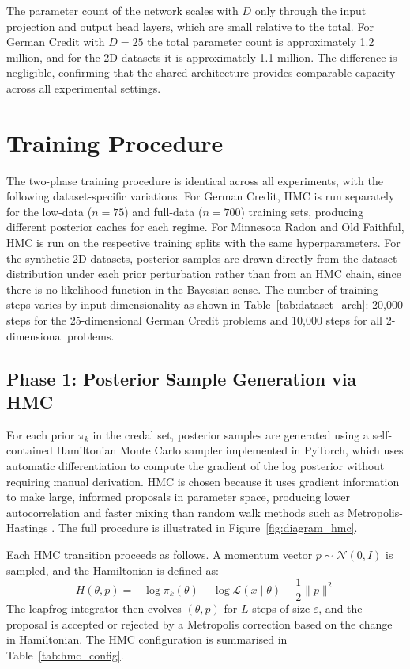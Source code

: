 The parameter count of the network scales 
with $D$ only through the input projection 
and output head layers, which are small 
relative to the total. For German Credit 
with $D = 25$ the total parameter count 
is approximately 1.2 million, and for 
the 2D datasets it is approximately 1.1 
million. The difference is negligible, 
confirming that the shared architecture 
provides comparable capacity across all 
experimental settings.

\section{Training Procedure}

The two-phase training procedure is identical 
across all experiments, with the following 
dataset-specific variations. For German Credit, 
HMC is run separately for the low-data 
($n = 75$) and full-data ($n = 700$) training 
sets, producing different posterior caches for 
each regime. For Minnesota Radon and Old 
Faithful, HMC is run on the respective training 
splits with the same hyperparameters. For the 
synthetic 2D datasets, posterior samples are 
drawn directly from the dataset distribution 
under each prior perturbation rather than from 
an HMC chain, since there is no likelihood 
function in the Bayesian sense. The number of 
training steps varies by input dimensionality 
as shown in Table~\ref{tab:dataset_arch}: 
20,000 steps for the 25-dimensional German 
Credit problems and 10,000 steps for all 
2-dimensional problems.

\subsection{Phase 1: Posterior Sample 
Generation via HMC}

For each prior $\pi_k$ in the credal 
set, posterior samples are generated 
using a self-contained Hamiltonian Monte 
Carlo sampler implemented in PyTorch, 
which uses automatic differentiation 
to compute the gradient of the log 
posterior without requiring manual 
derivation. HMC is chosen because it 
uses gradient information to make 
large, informed proposals in parameter 
space, producing lower autocorrelation 
and faster mixing than random walk 
methods such as Metropolis-Hastings 
\citep{neal2011}. The full procedure is 
illustrated in Figure~\ref{fig:diagram_hmc}.



Each HMC transition proceeds as follows. 
A momentum vector $p \sim \mathcal{N}(0, I)$ 
is sampled, and the Hamiltonian is defined 
as:
\begin{equation}
    H(\theta, p) = -\log \pi_k(\theta) 
    - \log \mathcal{L}(x \mid \theta) 
    + \frac{1}{2}\|p\|^2
\end{equation}
The leapfrog integrator then evolves 
$(\theta, p)$ for $L$ steps of size 
$\varepsilon$, and the proposal is 
accepted or rejected by a Metropolis 
correction based on the change in 
Hamiltonian. The HMC configuration 
is summarised in 
Table~\ref{tab:hmc_config}.

